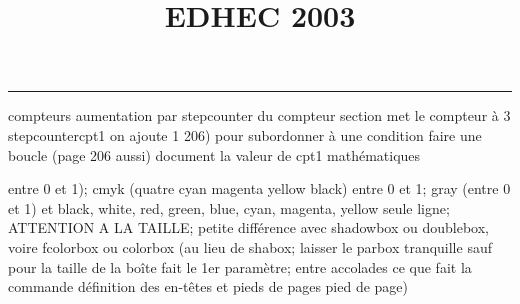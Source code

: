 \documentclass[11pt]{article}%
\title{\bf \vspace{-2cm} EDHEC 2003} %
\author{} %
\date{} %
\renewcommand{\headrulewidth}{0pt}%
\renewcommand{\footrulewidth}{0.4pt}%
\begin{document}
\maketitle %
\vspace{-1.4cm}\hrule %
\thispagestyle{fancy}

\vspace*{.2cm}



compteurs%
aumentation par stepcounter du compteur section%
met le compteur à 3%
stepcounter{cpt1} on ajoute 1%
206) pour subordonner à une condition %
faire une boucle (page 206 aussi) %
document la valeur de cpt1 
mathématiques\newcommand{\ch}{\operatorname{ch}} 
\newcommand{\sh}{\operatorname{sh}}
\renewcommand{\tanh}{\operatorname{th}}
\renewcommand{\sinh}{\operatorname{sh}}
\renewcommand{\cosh}{\operatorname{ch}}
\newcommand{\argsh}{\operatorname{argsh}}
\newcommand{\argch}{\operatorname{argch}}
\newcommand{\argth}{\operatorname{argth}}
\newcommand{\Id}{\operatorname{Id}}
\renewcommand{\leq}{\leq}
\renewcommand{\geq}{\geq }

\newcommand{\dlim}{\lim}
\newcommand{\dsum}{\sum}
\newcommand{\dprod}{\prod}



entre 0 et 1); cmyk (quatre cyan magenta yellow black) entre 0 et 1;
gray (entre 0 et 1) et black, white, red, green, blue, cyan, magenta,
yellow%
seule ligne; ATTENTION A LA TAILLE; petite différence avec shadowbox ou
doublebox, voire fcolorbox ou colorbox (au lieu de shabox; laisser le
parbox tranquille sauf pour la taille de la boîte
\newcommand{\Tbox}[1]{\begin{center} \shabox{\parbox{0.6
\linewidth}{#1}} \end{center}} %
fait le 1er paramètre; entre accolades ce que fait la commande
définition des en-têtes et pieds de pages\pagestyle{fancy}
\chead{}
\rfoot[ \ \thepage]{\thepage}
\cfoot{}
\lfoot{}
\thispagestyle{fancy} %
pied de page)\renewcommand{\footrulewidth}{0.4pt}
\renewcommand{\headrulewidth}{0.4pt}
\end{document}
